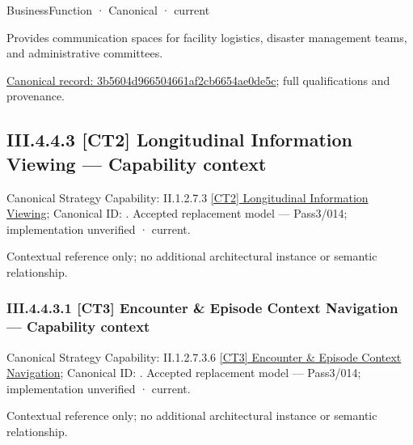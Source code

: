 \label{navigation:III.4.4.2.1.4.2.1}

\label{element:3b5604d966504661af2cb6654ae0de5c}
{\small BusinessFunction · Canonical · current}\par

Provides communication spaces for facility logistics, disaster management teams, and administrative committees.


{\footnotesize \href{../../../../../../../../continuum/business/business-function/3b5604d966504661af2cb6654ae0de5c.md}{Canonical record: 3b5604d966504661af2cb6654ae0de5c}; full qualifications and provenance.}\par
\subsection*{III.4.4.3 [CT2] Longitudinal Information Viewing — Capability context}
\label{navigation:III.4.4.3}

{\small Canonical Strategy Capability: II.1.2.7.3 \hyperref[element:b47f58042730497daf37e418ac865bb3]{[CT2] Longitudinal Information Viewing}; Canonical ID: \texttt{}. Accepted replacement model — Pass3/014; implementation unverified · current.}\par
Contextual reference only; no additional architectural instance or semantic relationship.\par
\subsubsection*{III.4.4.3.1 [CT3] Encounter \& Episode Context Navigation — Capability context}
\label{navigation:III.4.4.3.1}

{\small Canonical Strategy Capability: II.1.2.7.3.6 \hyperref[element:bfed62e152d742a3be947e824892064a]{[CT3] Encounter \& Episode Context Navigation}; Canonical ID: \texttt{}. Accepted replacement model — Pass3/014; implementation unverified · current.}\par
Contextual reference only; no additional architectural instance or semantic relationship.\par

